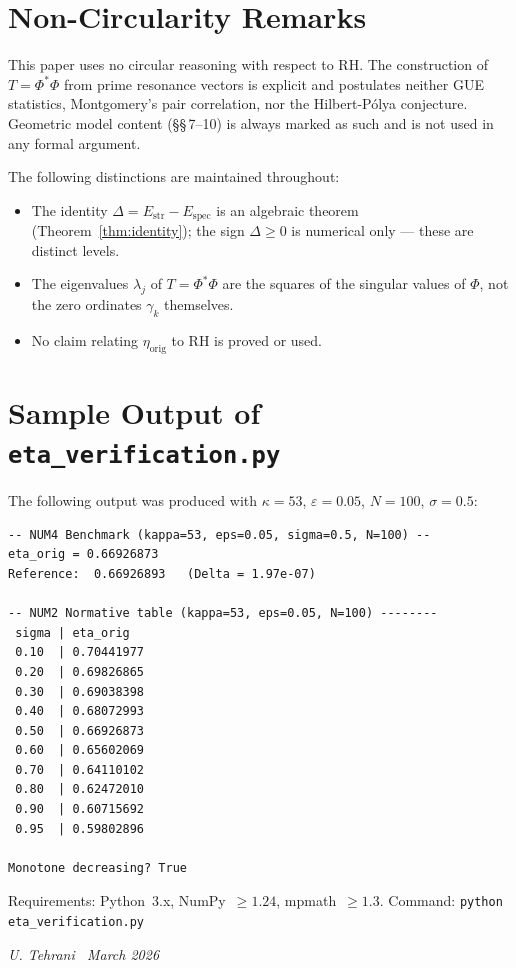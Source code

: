 \documentclass[11pt]{article}
\newcommand{\Estr}{E_{\mathrm{str}}}
\newcommand{\Espec}{E_{\mathrm{spec}}}
\newcommand{\etaorig}{\eta_{\mathrm{orig}}}
\begin{document}
\section{Non-Circularity Remarks}

This paper uses no circular reasoning with respect to RH\@. The construction
of $T=\Phi^*\Phi$ from prime resonance vectors is explicit and postulates
neither GUE statistics, Montgomery's pair correlation, nor the Hilbert-P\'olya
conjecture. Geometric model content (\S\S\,7--10) is always marked as such
and is not used in any formal argument.

The following distinctions are maintained throughout:
\begin{itemize}
\item The identity $\Delta=\Estr-\Espec$ is an algebraic theorem
(Theorem~\ref{thm:identity}); the sign $\Delta\geq 0$ is numerical only ---
these are distinct levels.
\item The eigenvalues $\lambda_j$ of $T=\Phi^*\Phi$ are the squares of the
singular values of $\Phi$, not the zero ordinates $\gamma_k$ themselves.
\item No claim relating $\etaorig$ to RH is proved or used.
\end{itemize}

\section{Sample Output of \texttt{eta\_verification.py}}

The following output was produced with $\kappa=53$, $\varepsilon=0.05$,
$N=100$, $\sigma=0.5$:

\begin{verbatim}
-- NUM4 Benchmark (kappa=53, eps=0.05, sigma=0.5, N=100) --
eta_orig = 0.66926873
Reference:  0.66926893   (Delta = 1.97e-07)

-- NUM2 Normative table (kappa=53, eps=0.05, N=100) --------
 sigma | eta_orig
 0.10  | 0.70441977
 0.20  | 0.69826865
 0.30  | 0.69038398
 0.40  | 0.68072993
 0.50  | 0.66926873
 0.60  | 0.65602069
 0.70  | 0.64110102
 0.80  | 0.62472010
 0.90  | 0.60715692
 0.95  | 0.59802896

Monotone decreasing? True
\end{verbatim}

Requirements: Python~3.x, NumPy~$\geq 1.24$, mpmath~$\geq 1.3$.
Command: \texttt{python eta\_verification.py}

\bigskip
\noindent\textit{U. Tehrani \textperiodcentered\ March 2026}
\end{document}
